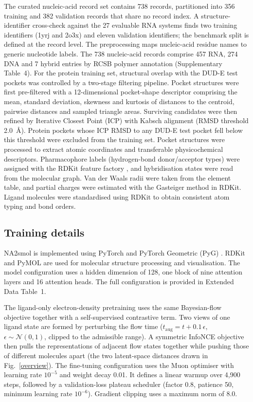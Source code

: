 \documentclass[pdflatex,sn-mathphys-num]{sn-jnl}
\theoremstyle{thmstyleone}
\theoremstyle{thmstyletwo}
\theoremstyle{thmstylethree}
\begin{document}
The curated nucleic-acid record set contains 738 records, partitioned into 356 training and 382 validation records that share no record index. A structure-identifier cross-check against the 27 evaluable RNA systems finds two training identifiers (1yrj and 2o3x) and eleven validation identifiers; the benchmark split is defined at the record level. The preprocessing maps nucleic-acid residue names to generic nucleotide labels. The 738 nucleic-acid records comprise 457 RNA, 274 DNA and 7 hybrid entries by RCSB polymer annotation (Supplementary Table~4). For the protein training set, structural overlap with the DUD-E test pockets was controlled by a two-stage filtering pipeline. Pocket structures were first pre-filtered with a 12-dimensional pocket-shape descriptor comprising the mean, standard deviation, skewness and kurtosis of distances to the centroid, pairwise distances and sampled triangle areas. Surviving candidates were then refined by Iterative Closest Point (ICP) with Kabsch alignment (RMSD threshold 2.0~\AA). Protein pockets whose ICP RMSD to any DUD-E test pocket fell below this threshold were excluded from the training set. Pocket structures were processed to extract atomic coordinates and transferable physicochemical descriptors. Pharmacophore labels (hydrogen-bond donor/acceptor types) were assigned with the RDKit feature factory \cite{landrum2024rdkit}, and hybridisation states were read from the molecular graph. Van der Waals radii were taken from the element table, and partial charges were estimated with the Gasteiger method in RDKit. Ligand molecules were standardised using RDKit \cite{landrum2024rdkit} to obtain consistent atom typing and bond orders.

\subsection{Training details}

NA2smol is implemented using PyTorch \cite{paszke2019pytorch} and PyTorch Geometric (PyG) \cite{fey2019pyg}. RDKit \cite{landrum2024rdkit} and PyMOL \cite{pymol2024} are used for molecular structure processing and visualisation. The model configuration uses a hidden dimension of 128, one block of nine attention layers and 16 attention heads. The full configuration is provided in Extended Data Table~1.

The ligand-only electron-density pretraining uses the same Bayesian-flow objective together with a self-supervised contrastive term. Two views of one ligand state are formed by perturbing the flow time ($t_{\mathrm{aug}}=t+0.1\,\epsilon$, $\epsilon\sim\mathcal{N}(0,1)$, clipped to the admissible range). A symmetric InfoNCE objective then pulls the representations of adjacent flow states together while pushing those of different molecules apart (the two latent-space distances drawn in Fig.~\ref{overview}). The fine-tuning configuration uses the Muon optimiser \cite{bernstein2024modular} with learning rate $10^{-5}$ and weight decay 0.01. It defines a linear warmup over 4,900 steps, followed by a validation-loss plateau scheduler (factor 0.8, patience 50, minimum learning rate $10^{-6}$). Gradient clipping uses a maximum norm of 8.0.
\end{document}
